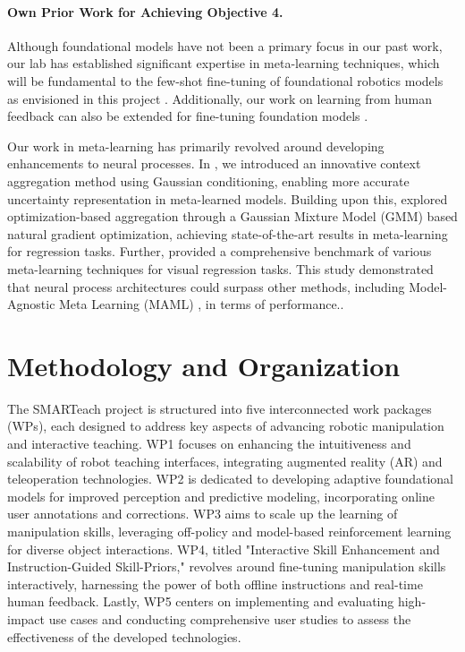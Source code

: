 \documentclass{erc-B2}
\begin{document}
\paragraph{Own Prior Work for Achieving Objective 4.} Although foundational models have not been a primary focus in our past work, our lab has established significant expertise in meta-learning techniques, which will be fundamental to the few-shot fine-tuning of foundational robotics models as envisioned in this project \cite{volpp2021bayesian, Volpp23, Gao}. Additionally, our work on learning from human feedback can also be extended for fine-tuning foundation models \cite{taranovic2023ailp}. 

Our work in meta-learning has primarily revolved around developing enhancements to neural processes. In \cite{volpp2021bayesian}, we introduced an innovative context aggregation method using Gaussian conditioning, enabling more accurate uncertainty representation in meta-learned models. Building upon this, \cite{Volpp23} explored optimization-based aggregation through a Gaussian Mixture Model (GMM) based natural gradient optimization, achieving state-of-the-art results in meta-learning for regression tasks. Further, \cite{Gao} provided a comprehensive benchmark of various meta-learning techniques for visual regression tasks. This study demonstrated that neural process architectures could surpass other methods, including Model-Agnostic Meta Learning (MAML) \cite{CITE}, in terms of performance.. 


\section{Methodology and Organization}
The SMARTeach project is structured into five interconnected work packages (WPs), each designed to address key aspects of advancing robotic manipulation and interactive teaching. WP1 focuses on enhancing the intuitiveness and scalability of robot teaching interfaces, integrating augmented reality (AR) and teleoperation technologies. WP2 is dedicated to developing adaptive foundational models for improved perception and predictive modeling, incorporating online user annotations and corrections. WP3 aims to scale up the learning of manipulation skills, leveraging off-policy and model-based reinforcement learning for diverse object interactions. WP4, titled "Interactive Skill Enhancement and Instruction-Guided Skill-Priors," revolves around fine-tuning manipulation skills interactively, harnessing the power of both offline instructions and real-time human feedback. Lastly, WP5 centers on implementing and evaluating high-impact use cases and conducting comprehensive user studies to assess the effectiveness of the developed technologies. %
\end{document}
